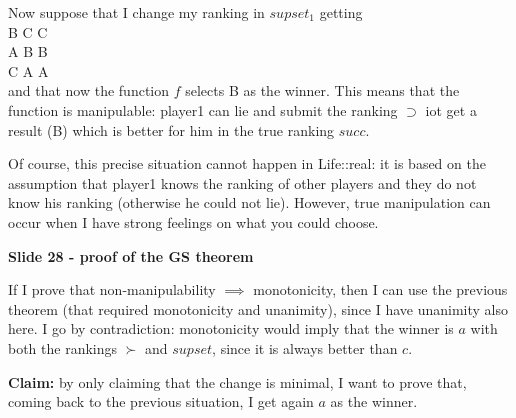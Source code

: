 \noindent Now suppose that I change my ranking in $supset_1$ getting\\ 
B \hspace{.6cm} C \hspace{.6cm} C\\
A \hspace{.6cm} B \hspace{.6cm} B\\
C \hspace{.6cm} A \hspace{.6cm} A\\
and that now the function $f$ selects B as the winner. This means that the 
function is manipulable: player1 can lie and submit the ranking $\supset$ iot 
get a result (B) which is better for him in the true ranking $succ$.

\noindent Of course, this precise situation cannot happen in Life::real: it is 
based on the assumption that player1 knows the ranking of other players and 
they do not know his ranking (otherwise he could not lie). However, true 
manipulation can occur when I have strong feelings on what you could choose.

\bigskip
\noindent \textbf{Slide 28 - proof of the GS theorem}

\noindent If I prove that non-manipulability $\implies$ monotonicity, then I can 
use the previous theorem (that required monotonicity and unanimity), since 
I have unanimity also here. I go by contradiction: monotonicity would imply 
that the winner is $a$ with both the rankings $\succ$ and $supset$, since it is 
always better than $c$.


\noindent \textbf{Claim:} by only claiming that the change is minimal, I want 
to prove that, coming back to the previous situation, I get again $a$ as the 
winner.

%
